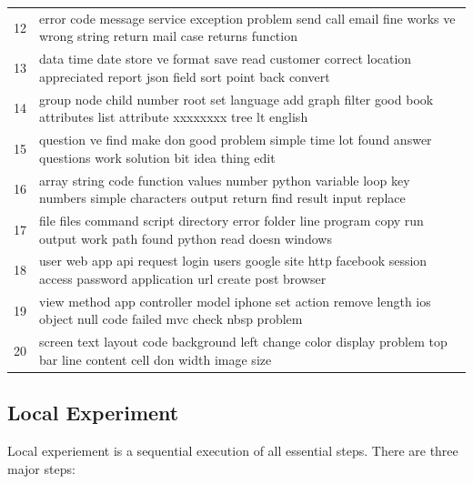 \documentclass[conference]{IEEEtran}
\begin{document}
\begin{table}[!t]
\begin{tabular}{ll}
12           & error code message service exception problem send call email fine works ve wrong string return mail case returns function                          \\
13           & data time date store ve format save read customer correct location appreciated report json field sort point back convert                           \\
14           & group node child number root set language add graph filter good book attributes list attribute xxxxxxxx tree lt english                            \\
15           & question ve find make don good problem simple time lot found answer questions work solution bit idea thing edit                                    \\
16           & array string code function values number python variable loop key numbers simple characters output return find result input replace                \\
17           & file files command script directory error folder line program copy run output work path found python read doesn windows                            \\
18           & user web app api request login users google site http facebook session access password application url create post browser                         \\
19           & view method app controller model iphone set action remove length ios object null code failed mvc check nbsp problem                                \\
20           & screen text layout code background left change color display problem top bar line content cell don width image size  \\ \hline                             
\end{tabular}
\end{table}
\subsection{Local Experiment}

Local experiement is a sequential execution of all essential steps. There are three major steps:
\end{document}
